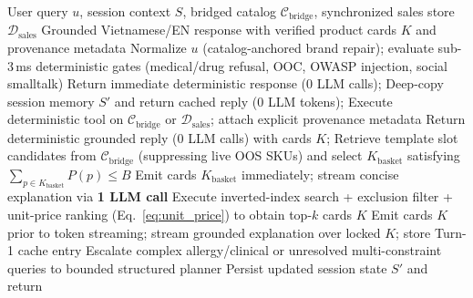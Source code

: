 \begin{algorithm}[htbp]
\caption{Zero-Planner Hybrid Routing with Grounded Tools (\texttt{Retail-AI-})}
\label{alg:zero_planner_sse}
\footnotesize
\begin{algorithmic}[1]
\Require User query $u$, session context $S$, bridged catalog $\mathcal{C}_{\text{bridge}}$, synchronized sales store $\mathcal{D}_{\text{sales}}$
\Ensure Grounded Vietnamese/EN response with verified product cards $K$ and provenance metadata
\State Normalize $u$ (catalog-anchored brand repair); evaluate sub-3\,ms deterministic gates (medical/drug refusal, OOC, OWASP injection, social smalltalk)
    \State Return immediate deterministic response (0 LLM calls); \Return
\EndIf
{}
    \State Deep-copy session memory $S'$ and return cached reply (0 LLM tokens); \Return
\EndIf
{}
    \State Execute deterministic tool on $\mathcal{C}_{\text{bridge}}$ or $\mathcal{D}_{\text{sales}}$; attach explicit provenance metadata
    \State Return deterministic grounded reply (0 LLM calls) with cards $K$; \Return
\EndIf
{}
    \State Retrieve template slot candidates from $\mathcal{C}_{\text{bridge}}$ (suppressing live OOS SKUs) and select $K_{\text{basket}}$ satisfying $\sum_{p \in K_{\text{basket}}} P(p) \le B$
    \State Emit cards $K_{\text{basket}}$ immediately; stream concise explanation via \textbf{1 LLM call}
    \State Execute inverted-index search + exclusion filter + unit-price ranking (Eq.~\ref{eq:unit_price}) to obtain top-$k$ cards $K$
    \State Emit cards $K$ prior to token streaming; stream grounded explanation over locked $K$; store Turn-1 cache entry
\Else
    \State Escalate complex allergy/clinical or unresolved multi-constraint queries to bounded structured planner
\EndIf
\State Persist updated session state $S'$ and return
\end{algorithmic}
\end{algorithm}


